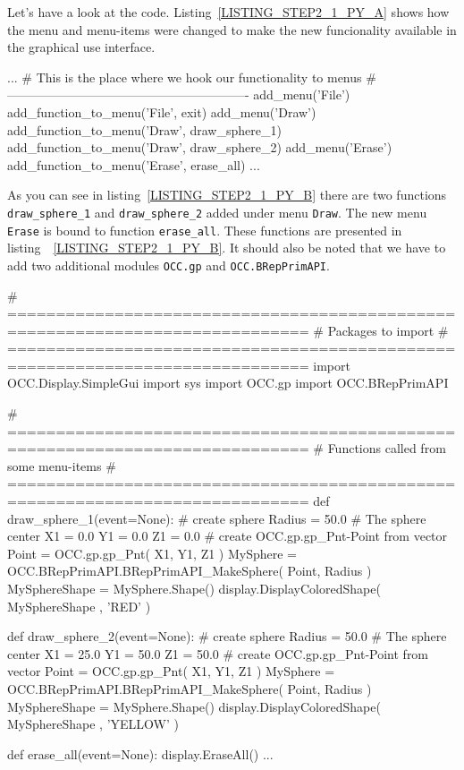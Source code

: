 Let's have a look at the code.
Listing~\ref{LISTING_STEP2_1_PY_A} shows how the menu and menu-items were changed to make the new funcionality available in the graphical use interface.
\begin{python}[moreemph={[4], 46, 48},caption={Step2\_1.py - Extending the menu},label=LISTING_STEP2_1_PY_A]
...
    # This is the place where we hook our functionality to menus
    # ----------------------------------------------------------
    add_menu('File')
    add_function_to_menu('File',  exit)
    add_menu('Draw')
    add_function_to_menu('Draw', draw_sphere_1)
    add_function_to_menu('Draw', draw_sphere_2)
    add_menu('Erase')
    add_function_to_menu('Erase', erase_all)
...    
\end{python}
As you can see in listing~\ref{LISTING_STEP2_1_PY_B} there are two functions {\tt draw\_sphere\_1} and {\tt draw\_sphere\_2} added under menu {\tt Draw}.
The new menu {\tt Erase} is bound to function {\tt erase\_all}.
These functions are presented in listing~~\ref{LISTING_STEP2_1_PY_B}.
It should also be noted that we have to add two additional modules {\tt OCC.gp} and {\tt OCC.BRepPrimAPI}.
%
\begin{python}[moreemph={[4], 46, 48},caption={Step2\_1.py - Extending the functionality},label=LISTING_STEP2_1_PY_B]
# =============================================================================
# Packages to import
# =============================================================================
import OCC.Display.SimpleGui 
import sys
import OCC.gp 
import OCC.BRepPrimAPI 

# =============================================================================
# Functions called from some menu-items
# =============================================================================
def draw_sphere_1(event=None):
    # create sphere
    Radius = 50.0
    # The sphere center
    X1 = 0.0
    Y1 = 0.0
    Z1 = 0.0
    # create OCC.gp.gp_Pnt-Point from vector
    Point = OCC.gp.gp_Pnt( X1, Y1, Z1 )     
    MySphere = OCC.BRepPrimAPI.BRepPrimAPI_MakeSphere( Point, Radius )  
    MySphereShape = MySphere.Shape()
    display.DisplayColoredShape( MySphereShape , 'RED' ) 

def draw_sphere_2(event=None):
    # create sphere
    Radius = 50.0
    # The sphere center
    X1 = 25.0
    Y1 = 50.0
    Z1 = 50.0
    # create OCC.gp.gp_Pnt-Point from vector
    Point = OCC.gp.gp_Pnt( X1, Y1, Z1 )     
    MySphere = OCC.BRepPrimAPI.BRepPrimAPI_MakeSphere( Point, Radius )  
    MySphereShape = MySphere.Shape()
    display.DisplayColoredShape( MySphereShape , 'YELLOW' ) 

def erase_all(event=None):
    display.EraseAll()
...    
\end{python}

